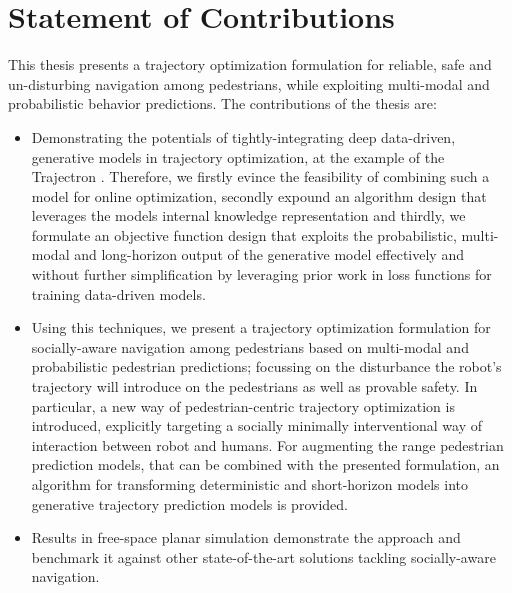 \section{Statement of Contributions}
\label{text:introduction/contributions}
This thesis presents a trajectory optimization formulation for reliable, safe and un-disturbing navigation among pedestrians, while exploiting multi-modal and probabilistic behavior predictions.
\newline\newline
The contributions of the thesis are:

\begin{itemize}
\item Demonstrating the potentials of tightly-integrating deep data-driven, generative models in trajectory optimization, at the example of the Trajectron \cite{Ivanovic2018}\cite{Salzmann2020}. Therefore, we firstly evince the feasibility of combining such a model for online optimization, secondly expound an algorithm design that leverages the models internal knowledge representation and thirdly, we formulate an objective function design that exploits the probabilistic, multi-modal and long-horizon output of the generative model effectively and without further simplification by leveraging prior work in loss functions for training data-driven models.  
\item Using this techniques, we present a trajectory optimization formulation for socially-aware navigation among pedestrians based on multi-modal and probabilistic pedestrian predictions; focussing on the disturbance the robot's trajectory will introduce on the pedestrians as well as provable safety. In particular, a new way of pedestrian-centric trajectory optimization is introduced, explicitly targeting a socially minimally interventional way of interaction between robot and humans. For augmenting the range pedestrian prediction models, that can be combined with the presented formulation, an algorithm for transforming deterministic and short-horizon models into generative trajectory prediction models is provided.
\item Results in free-space planar simulation demonstrate the approach and benchmark it against other state-of-the-art solutions tackling socially-aware navigation.
\end{itemize}